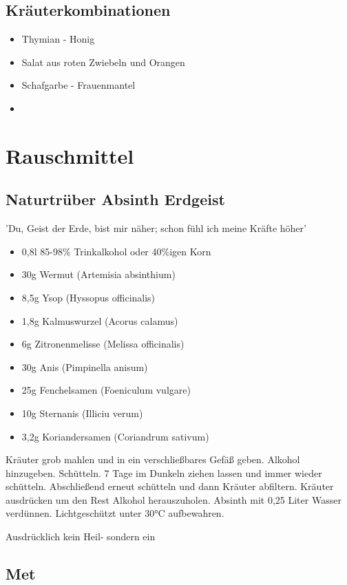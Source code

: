 \subsection{Kräuterkombinationen}
\begin{itemize}
	\item Thymian - Honig
	\item Salat aus roten Zwiebeln und Orangen
	\item Schafgarbe - Frauenmantel
	\item 
\end{itemize}

\newpage


\section{Rauschmittel}


\subsection{Naturtrüber Absinth Erdgeist}

'Du, Geist der Erde, bist mir näher; schon fühl ich meine Kräfte höher'

\begin{itemize}
	\item 0,8l 85-98\% Trinkalkohol oder 40\%igen Korn
	\item 30g Wermut (Artemisia absinthium)
	\item 8,5g Ysop (Hyssopus officinalis)
	\item 1,8g Kalmuswurzel (Acorus calamus)
	\item 6g Zitronenmelisse (Melissa officinalis)
	\item 30g Anis (Pimpinella anisum)
	\item 25g Fenchelsamen (Foeniculum vulgare)
	\item 10g Sternanis (Illiciu verum)
	\item 3,2g Koriandersamen (Coriandrum sativum)
\end{itemize}

Kräuter grob mahlen und in ein verschließbares Gefäß geben.
Alkohol hinzugeben.
Schütteln.
7 Tage im Dunkeln ziehen lassen und immer wieder schütteln.
Abschließend erneut schütteln und dann Kräuter abfiltern.
Kräuter ausdrücken um den Rest Alkohol herauszuholen.
Absinth mit 0,25 Liter Wasser verdünnen.
Lichtgeschützt unter 30°C aufbewahren.


Ausdrücklich kein Heil- sondern ein 


\subsection{Met}


